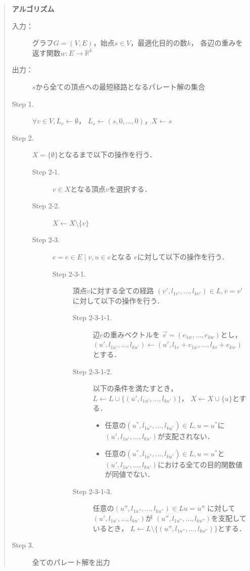 \documentclass[12pt]{optlab-bachelor}
\begin{document}
\begin{quote}
  \textbf{アルゴリズム}
  \begin{description}
    \item[入力：] グラフ$G=(V,E)$，始点$s \in V$，最適化目的の数$k$，
    各辺の重みを返す関数$w : E \to \mathbb{R}^k$
    \item[出力：] $s$から全ての頂点への最短経路となるパレート解の集合
    \item[Step 1.] $\forall v \in V , L_v \leftarrow \emptyset$，
    $L_s \leftarrow (s,0,\ldots,0)$，$X \leftarrow s$
    \item[Step 2.] $X = \{\emptyset\}$となるまで以下の操作を行う．
    \begin{description}
      \item[Step 2-1.] $v \in X$となる頂点$v$を選択する．
      \item[Step 2-2.] $X \leftarrow X \setminus \{ v \}$
      \item[Step 2-3.] $e = {e \in E \mid v,u \in e}$となる
      $e$に対して以下の操作を行う．
      \begin{description}
        \item[Step 2-3-1.] 頂点$v$に対する全ての経路
        $(v',l_{1v'},\ldots,l_{kv'}) \in L,v=v'$に対して以下の操作を行う．
        \begin{description}
          \item[Step 2-3-1-1.] 辺$e$の重みベクトルを
          $\vec{e} = (e_{1w},\ldots,e_{kw})$とし，
          $(u',l_{1u'},\ldots,l_{ku'}) \leftarrow
          (u',l_{1v}+e_{1w},\ldots,l_{kv}+e_{kw})$とする．
          \item[Step 2-3-1-2.] 以下の条件を満たすとき，
          $L \leftarrow L \cup \{(u',l_{1u'},\ldots,l_{ku'})\}$，
          $X \leftarrow X \cup \{ u\}$とする．
          \begin{itemize}
            \item 任意の$(u^*,l_{1u^*},\ldots,l_{ku^*})\in L,u=u^*$に
            $(u',l_{1u'},\ldots,l_{ku'})$が支配されない．
            \item 任意の$(u^*,l_{1u^*},\ldots,l_{ku^*}) \in L,u=u^*$と
            $(u',l_{1u'},\ldots,l_{ku'})$における全ての目的関数値が同値でない．
          \end{itemize}
          \item[Step 2-3-1-3.] 任意の$(u'',l_{1u''},\ldots,l_{ku''})\in Lu=u''$
          に対して$(u',l_{1u'},\ldots,l_{ku'})$が
          $(u'',l_{1u''},\ldots,l_{ku''})$を支配しているとき，
          $L \leftarrow L \setminus \{(u'',l_{1u''},\ldots,l_{ku''})\}$とする．
        \end{description}
      \end{description}
    \end{description}
    \item[Step 3.] 全てのパレート解を出力
  \end{description}
\end{quote}
\end{document}
